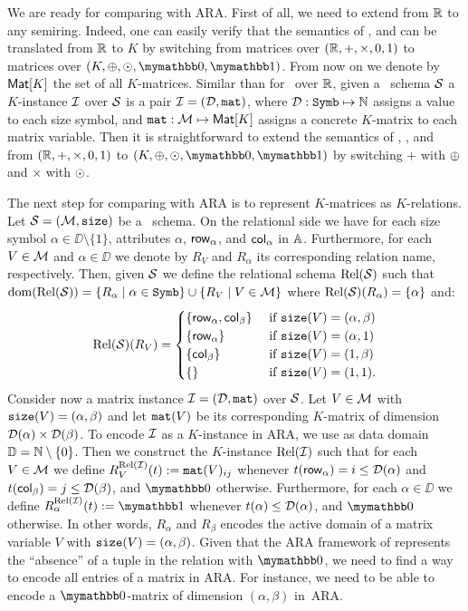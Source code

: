 We are ready for comparing \langsum with ARA. First of all, we need to extend \langsum from $\mathbb{R}$ to any semiring. Indeed, one can easily verify that the semantics of \lang, \langfor and \langsum can be translated from $\mathbb{R}$ to $K$ by switching from matrices over $(\mathbb{R}, +, \times, 0, 1)$ to matrices over $(K, \ksum, \kprod, \kzero, \kone)$.
From now on we denote by  $\textsf{Mat}[K]$ the set of all $K$-matrices. Similar than for \lang\ over $\mathbb{R}$, given a \lang\ schema $\mathcal{S}$ a $K$-instance $\mathcal{I}$ over $\mathcal{S}$ is a pair $\mathcal{I} = (\mathcal{D},\texttt{mat})$, where $\mathcal{D} : \texttt{Symb} \mapsto \mathbb{N}$ assigns a value to each size symbol, and $\texttt{mat} : \mathcal{M} \mapsto \textsf{Mat}[K]$ assigns a concrete $K$-matrix to each matrix variable. Then it is straightforward to extend the semantics of \lang, \langfor, and \langsum from $(\mathbb{R}, +, \times, 0, 1)$ to $(K, \ksum, \kprod, \kzero, \kone)$ by switching $+$ with $\oplus$ and $\times$ with $\odot$. 

The next step for comparing \langsum with ARA is to represent $K$-matrices as $K$-relations.
Let $\mathcal{S}=(\mathcal{M},\texttt{size})$ be a \lang\ schema. On the relational side
we have for each size symbol $\alpha\in\DD\setminus\{1\}$, attributes $\alpha$, $\mathsf{row}_\alpha$, and $\mathsf{col}_\alpha$ in $\mathbb{A}$. Furthermore, for each $V\in\mathcal{M}$ and $\alpha \in \DD$ we denote
by $R_V$ and $R_\alpha$ its corresponding relation name, respectively. Then, given $\mathcal{S}$ we define the relational schema $\text{Rel}(\mathcal{S})$ such that $\operatorname{dom}(\text{Rel}(\mathcal{S})) =  \{R_\alpha \mid \alpha\in\texttt{Symb}\} \cup \{R_V \mid V \in \mathcal{M}\}$ where $\text{Rel}(\mathcal{S})(R_\alpha) = \{\alpha\}$ and:
\[
\text{Rel}(\mathcal{S})(R_V) = \begin{cases}
\lbrace\mathsf{row}_\alpha,\mathsf{col}_\beta \rbrace & \text{ if $ \texttt{size}(V)=(\alpha,\beta)$} \\
\lbrace\mathsf{row}_\alpha \rbrace & \text{ if $ \texttt{size}(V)=(\alpha,1)$} \\
\lbrace\mathsf{col}_\beta \rbrace  &
\text{ if $ \texttt{size}(V)=(1,\beta)$} \\
\lbrace\rbrace & \text{ if $\texttt{size}(V)=(1,1)$}.
\end{cases}
\]
Consider now a matrix instance $\mathcal{I} = (\mathcal{D},\texttt{mat})$ over $\mathcal{S}$.
Let $V\in\mathcal{M}$ with $\texttt{size}(V)=(\alpha,\beta)$ and let $\texttt{mat}(V)$ be its corresponding $K$-matrix of dimension $\mathcal{D}(\alpha)\times \mathcal{D}(\beta)$.
To encode $\mathcal{I}$ as a $K$-instance in ARA, we use as data domain $\mathbb{D} = \mathbb{N} \setminus \{0\}$. Then we construct the $K$-instance $\text{Rel}(\mathcal{I})$ such that for each $V\in\mathcal{M}$ we define 
$R_V^{\text{Rel}(\mathcal{I})}(t):=\texttt{mat}(V)_{ij}$ whenever $t(\mathsf{row}_\alpha) = i \leq \mathcal{D}(\alpha)$ and $t(\mathsf{col}_\beta) = j \leq \mathcal{D}(\beta)$, and $\kzero$ otherwise. Furthermore, for each $\alpha \in \DD$ we define $R_\alpha^{\text{Rel}(\I)}(t):=\kone$ whenever $t(\alpha) \leq \mathcal{D}(\alpha)$, and $\kzero$ otherwise. In other words, $R_\alpha$ and $R_\beta$ encodes the active domain of a matrix variable $V$ with $\texttt{size}(V)=(\alpha,\beta)$. Given that the ARA framework of \cite{GreenKT07} represents the ``absence'' of a tuple in the relation with $\kzero$, we need to find a way to encode all entries of a matrix in ARA. For instance, we need to be able to encode a $\kzero$-matrix of dimension $(\alpha,\beta)$ in~ARA.

